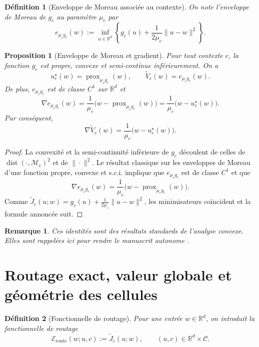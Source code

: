 \documentclass[11pt,a4paper]{article}
\newtheorem{definition}{Définition}[section]
\newtheorem{proposition}{Proposition}[section]
\newtheorem{remark}{Remarque}[section]
\DeclareMathOperator{\prox}{prox}
\DeclareMathOperator{\dist}{dist}
\newcommand{\R}{\mathbb R}
\newcommand{\Mcal}{\mathcal M}
\newcommand{\Ccal}{\mathcal C}
\begin{document}
\begin{definition}[Enveloppe de Moreau associée au contexte]
On note l'enveloppe de Moreau de \(g_c\) au paramètre \(\mu_c\) par
\[
e_{\mu_c g_c}(w):=\inf_{u\in\R^d}\left\{g_c(u)+\frac{1}{2\mu_c}\|u-w\|^2\right\}.
\]
\end{definition}

\begin{proposition}[Enveloppe de Moreau et gradient]
Pour tout contexte \(c\), la fonction \(g_c\) est propre, convexe et semi-continue inférieurement. On a
\[
u_c^\star(w)=\prox_{\mu_c g_c}(w),
\qquad
\widetilde V_c(w)=e_{\mu_c g_c}(w).
\]
De plus, \(e_{\mu_c g_c}\) est de classe \(C^1\) sur \(\R^d\) et
\[
\nabla e_{\mu_c g_c}(w)=\frac{1}{\mu_c}\bigl(w-\prox_{\mu_c g_c}(w)\bigr)
=\frac{1}{\mu_c}\bigl(w-u_c^\star(w)\bigr).
\]
Par conséquent,
\[
\nabla \widetilde V_c(w)=\frac{1}{\mu_c}\bigl(w-u_c^\star(w)\bigr).
\]
\end{proposition}

\begin{proof}
La convexité et la semi-continuité inférieure de \(g_c\) découlent de celles de \(\dist(\cdot,\Mcal_c)^2\) et de \(\|\cdot\|^2\). Le résultat classique sur les enveloppes de Moreau d'une fonction propre, convexe et s.c.i. implique que \(e_{\mu_c g_c}\) est de classe \(C^1\) et que
\[
\nabla e_{\mu_c g_c}(w)=\frac{1}{\mu_c}\bigl(w-\prox_{\mu_c g_c}(w)\bigr).
\]
Comme \(\widetilde J_c(u;w)=g_c(u)+\frac{1}{2\mu_c}\|u-w\|^2\), les minimisateurs coïncident et la formule annoncée suit.
\end{proof}

\begin{remark}
Ces identités sont des résultats standards de l'analyse convexe. Elles sont rappelées ici pour rendre le manuscrit autonome \cite{Moreau1965,Rockafellar1970,BauschkeCombettes2017,RockafellarWets1998}.
\end{remark}

\section{Routage exact, valeur globale et géométrie des cellules}

\begin{definition}[Fonctionnelle de routage]
Pour une entrée \(w\in\R^d\), on introduit la fonctionnelle de routage
\[
\mathcal E_{\mathrm{route}}(w;u,c):=\widetilde J_c(u;w),
\qquad
(u,c)\in \R^d\times\Ccal.
\]
\end{definition}
\end{document}
